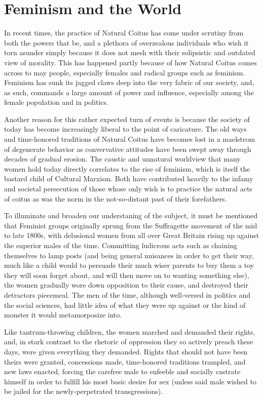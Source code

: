 \section*{Feminism and the World}

In recent times, the practice of Natural Coitus has come under scrutiny from both the powers that be, and a plethora 
of overzealous individuals who wish it torn asunder simply because it does not mesh with their solipsistic and outdated 
view of morality. This has happened partly because of how Natural Coitus comes across to may people, especially females 
and radical groups such as feminism. Feminism has sunk its jagged claws deep into the very fabric of our society, and, 
as such, commands a large amount of power and influence, especially among the female population and in politics.

Another reason for this rather expected turn of events is because the society of today has become increasingly 
liberal to the point of caricature. The old ways and time-honored traditions of Natural Coitus have becomes 
lost in a maelstrom of degenerate behavior as convervative attitudes have been swept away through decades 
of gradual erosion. The caustic and unnatural worldview that many women hold today directly correlates 
to the rise of feminism, which is itself the bastard child of Cultural Marxism. Both have contributed 
heavily to the infamy and societal persecution of those whose only wish is to practice the natural 
acts of coitus as was the norm in the not-so-distant past of their forefathers.

To illuminate and broaden our understaning of the subject, it must be mentioned that Feminist groups originally 
sprung from the Suffragette movement of the mid to late 1800s, with delusional women from all over Great Britain 
rising up against the superior males of the time. Committing ludicrous acts such as chaining themselves to lamp 
posts (and being general nuisances in order to get their way, much like a child would to persuade their much 
wiser parents to buy them a toy they will soon forget about, and will then move on to wanting something else), 
the women gradually wore down opposition to their cause, and destroyed their detractors piecemeal. The men 
of the time, although well-versed in politics and the social sciences, had little idea of what they were 
up against or the kind of monster it would metamorposize into.

Like tantrum-throwing children, the women marched and demanded their rights, and, in stark contrast to the 
rhetoric of oppression they so actively preach these days, were given everything they demanded. Rights that 
should not have been theirs were granted, concessions made, time-honored traditions trampled, and new laws 
enacted, forcing the carefree male to enfeeble and socially castrate himself in order to fulfill his most 
basic desire for sex (unless said male wished to be jailed for the newly-perpetrated transgressions).

